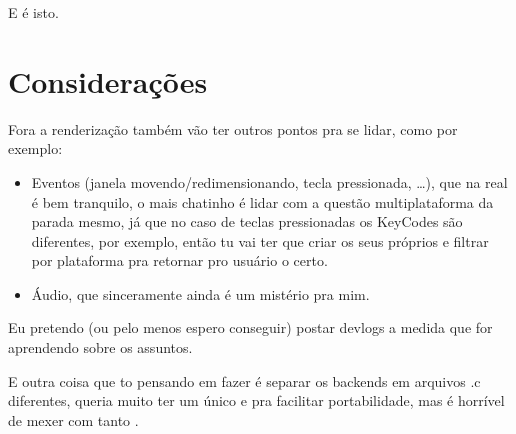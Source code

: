 \documentclass[a4paper,oneside,12pt]{article}
\begin{document}
E é isto.

\section{Considerações}

Fora a renderização também vão ter outros pontos pra se lidar, como por exemplo:

\begin{itemize}
    \item Eventos (janela movendo/redimensionando, tecla pressionada, …), que na real é bem tranquilo, o mais chatinho é lidar com a questão multiplataforma da parada mesmo, já que no caso de teclas pressionadas os KeyCodes são diferentes, por exemplo, então tu vai ter que criar os seus próprios e filtrar por plataforma pra retornar pro usuário o certo.
    \item Áudio, que sinceramente ainda é um mistério pra mim.
\end{itemize}

Eu pretendo (ou pelo menos espero conseguir) postar devlogs a medida que for aprendendo sobre os assuntos.

E outra coisa que to pensando em fazer é separar os backends em arquivos .c diferentes, queria muito ter um único  e  pra facilitar portabilidade, mas é horrível de mexer com tanto .
\end{document}
